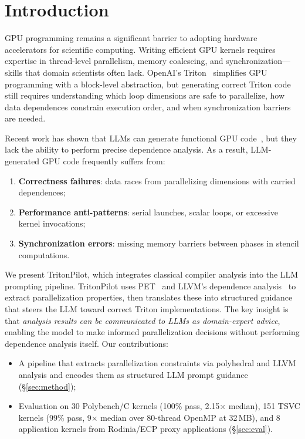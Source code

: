 \documentclass[sigconf]{acmart}
\newcommand{\sysname}{TritonPilot\xspace}
\newcommand{\pet}{PET\xspace}
\begin{document}
\maketitle

\section{Introduction}
\label{sec:intro}

GPU programming remains a significant barrier to adopting hardware
accelerators for scientific computing.  Writing efficient GPU kernels
requires expertise in thread-level parallelism, memory coalescing,
and synchronization---skills that domain scientists often lack.
OpenAI's Triton~\cite{tillet2019triton} simplifies GPU programming
with a block-level abstraction, but generating correct Triton code
still requires understanding which loop dimensions are safe to
parallelize, how data dependences constrain execution order, and when
synchronization barriers are needed.

Recent work has shown that LLMs can generate functional GPU
code~\cite{chen2024chatgpt, ouyang2024kernelbench}, but they lack the
ability to perform precise dependence analysis.  As a result,
LLM-generated GPU code frequently suffers from:
\begin{enumerate}
  \item \textbf{Correctness failures}: data races from parallelizing
    dimensions with carried dependences;
  \item \textbf{Performance anti-patterns}: serial launches,
    scalar loops, or excessive kernel invocations;
  \item \textbf{Synchronization errors}: missing memory barriers
    between phases in stencil computations.
\end{enumerate}

We present \sysname, which integrates classical compiler analysis into
the LLM prompting pipeline.  \sysname uses \pet~\cite{verdoolaege2012polyhedral}
and LLVM's dependence analysis~\cite{llvm} to extract parallelization
properties, then translates these into structured guidance that steers
the LLM toward correct Triton implementations.  The key insight is that
\emph{analysis results can be communicated to LLMs as domain-expert
advice}, enabling the model to make informed parallelization decisions
without performing dependence analysis itself.  Our contributions:
\begin{itemize}
  \item A pipeline that extracts parallelization constraints via
    polyhedral and LLVM analysis and encodes them as structured LLM
    prompt guidance (\S\ref{sec:method});
  \item Evaluation on 30 Polybench/C kernels (100\% pass, 2.15$\times$
    median), 151 TSVC kernels (99\% pass, 9$\times$ median over
    80-thread OpenMP at 32\,MB), and 8 application kernels from
    Rodinia/ECP proxy applications (\S\ref{sec:eval}).
\end{itemize}
\end{document}
